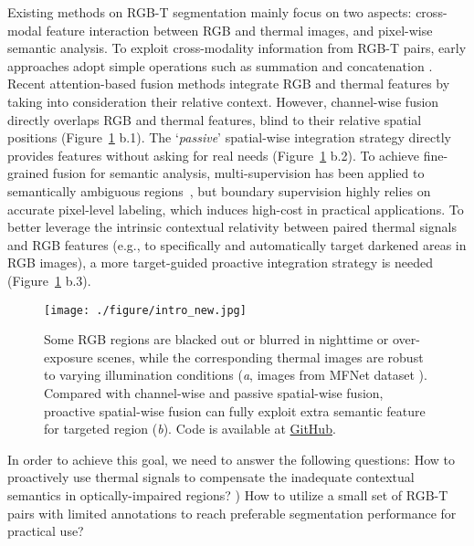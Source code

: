 \documentclass[letterpaper, 10 pt, conference]{ieeeconf}
\begin{document}
Existing methods on RGB-T segmentation mainly focus on two aspects: cross-modal feature interaction between RGB and thermal images, and pixel-wise semantic analysis. To exploit cross-modality information from RGB-T pairs, early approaches adopt simple operations such as summation and concatenation \cite{mfnet, rtfnet, fuseseg, mffenet}. Recent attention-based fusion methods \cite{feanet, gmnet, ABMDRNet, mitigating, 10103760, li2022rgb, 9987529, zhou2022mtanet, Zhang_2023_CVPR} integrate RGB and thermal features by taking into consideration their relative context. However, channel-wise fusion directly overlaps RGB and thermal features, blind to their relative spatial positions (Figure~\ref{fig:intro} b.1). The `\textit{passive}' spatial-wise integration strategy directly provides features without asking for real needs (Figure~\ref{fig:intro} b.2). To achieve fine-grained fusion for semantic analysis, multi-supervision has been applied to semantically ambiguous regions~\cite{gmnet, mffenet}, but boundary supervision highly relies on accurate pixel-level labeling, which induces high-cost in practical applications. To better leverage the intrinsic contextual relativity between paired thermal signals and RGB features (e.g., to specifically and automatically target darkened areas in RGB images), a more target-guided proactive integration strategy is needed (Figure~\ref{fig:intro} b.3). 
\begin{figure}[t]
  \centering
  \texttt{[image: ./figure/intro\_new.jpg]}
  \caption{Some RGB regions are blacked out or blurred in nighttime or over-exposure scenes, while the corresponding thermal images are robust to varying illumination conditions (\textit{a}, images from MFNet dataset \cite{mfnet}). Compared with channel-wise and passive spatial-wise fusion,  proactive spatial-wise fusion can fully exploit extra semantic feature for targeted region (\textit{b}). Code is available at \href{https://github.com/leofansq/SpiderMesh}{GitHub}.}
  \label{fig:intro}
\end{figure}


In order to achieve this goal, we need to answer the following questions:  How to proactively use thermal signals to compensate the inadequate contextual semantics in optically-impaired regions? 
) How to utilize a small set of RGB-T pairs with limited annotations to reach preferable segmentation performance for practical use?
\end{document}
